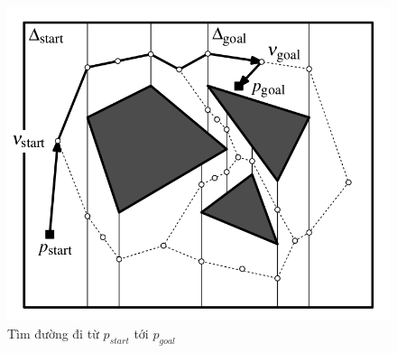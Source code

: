 \documentclass[a4paper,12pt]{report}
\begin{document}
\begin{figure}[H]
\centering
\label{find_path_robot_point}
\includegraphics[scale=0.3]{find_path_robot_point.png}
\caption{Tìm đường đi từ $p_{start}$ tới $p_{goal}$}
\end{figure}
\end{document}
